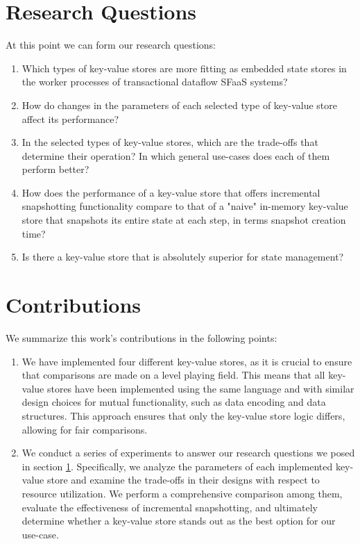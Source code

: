 \section{Research Questions}
\label{section-reseach-questions}

At this point we can form our research questions:

\begin{enumerate}
    \item Which types of key-value stores are more fitting as embedded state stores in the worker processes of transactional dataflow SFaaS systems?
    \item How do changes in the parameters of each selected type of key-value store affect its performance?
    \item In the selected types of key-value stores, which are the trade-offs that determine their operation? In which general use-cases does each of them perform better?
    \item How does the performance of a key-value store that offers incremental snapshotting functionality compare to that of a "naive" in-memory key-value store that snapshots its entire state at each step, in terms snapshot creation time?
    \item Is there a key-value store that is absolutely superior for state management? %
\end{enumerate}

\section{Contributions}

We summarize this work's contributions in the following points:

\begin{enumerate}
    \item We have implemented four different key-value stores, as it is crucial to ensure that comparisons are made on a level playing field. This means that all key-value stores have been implemented using the same language and with similar design choices for mutual functionality, such as data encoding and data structures. This approach ensures that only the key-value store logic differs, allowing for fair comparisons.
    
    \item We conduct a series of experiments to answer our research questions we posed in section \ref{section-reseach-questions}. Specifically, we analyze the parameters of each implemented key-value store and examine the trade-offs in their designs with respect to resource utilization. We perform a comprehensive comparison among them, evaluate the effectiveness of incremental snapshotting, and ultimately determine whether a key-value store stands out as the best option for our use-case.
\end{enumerate}

